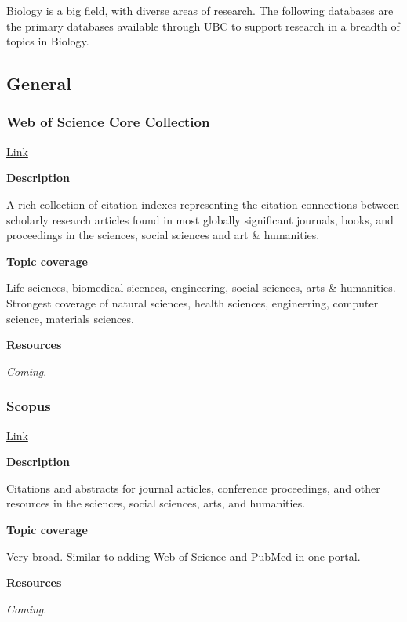 \documentclass[
]{book}
\begin{document}
Biology is a big field, with diverse areas of research. The following databases are the primary databases available through UBC to support research in a breadth of topics in Biology.

\hypertarget{general}{%
\subsection{General}\label{general}}

\hypertarget{web-of-science-core-collection}{%
\subsubsection{Web of Science Core Collection}\label{web-of-science-core-collection}}

\href{https://resources.library.ubc.ca/page.php?details=web-of-science-core-collection\&id=138}{Link}

\textbf{Description}

A rich collection of citation indexes representing the citation connections between scholarly research articles found in most globally significant journals, books, and proceedings in the sciences, social sciences and art \& humanities.

\textbf{Topic coverage}

Life sciences, biomedical sicences, engineering, social sciences, arts \& humanities. Strongest coverage of natural sciences, health sciences, engineering, computer science, materials sciences.

\textbf{Resources}

\emph{Coming}.

\hypertarget{scopus}{%
\subsubsection{Scopus}\label{scopus}}

\href{https://resources.library.ubc.ca/page.php?details=scopus\&id=2677}{Link}

\textbf{Description}

Citations and abstracts for journal articles, conference proceedings, and other resources in the sciences, social sciences, arts, and humanities.

\textbf{Topic coverage}

Very broad. Similar to adding Web of Science and PubMed in one portal.

\textbf{Resources}

\emph{Coming}.
\end{document}
